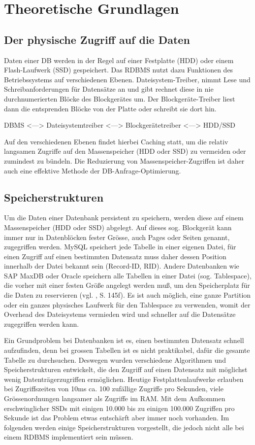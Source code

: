 \section{Theoretische Grundlagen}
\subsection{Der physische Zugriff auf die Daten}
Daten einer DB werden in der Regel auf einer Festplatte (HDD) oder einem Flash-Laufwerk (SSD) gespeichert.
Das RDBMS nutzt dazu Funktionen des Betriebssystems auf verschiedenen Ebenen.
Dateisystem-Treiber, nimmt Lese und Schreibanforderungen für Datensätze an und gibt rechnet diese in nie durchnumerierten Blöcke des Blockgerätes um. Der Blockgeräte-Treiber liest dann die entsprenden Blöcke von der Platte oder schreibt sie dort hin.

DBMS <---> Dateisystemtreiber <---> Blockgerätetreiber <---> HDD/SSD 

Auf den verschiedenen Ebenen findet hierbei Caching statt, um die relativ langsamen Zugriffe auf den Massenspeicher (HDD oder SSD) zu vermeiden oder zumindest zu bündeln. Die Reduzierung von Massenspeicher-Zugriffen ist  daher auch eine effektive Methode der DB-Anfrage-Optimierung.

\subsection{Speicherstrukturen}
Um die Daten einer Datenbank persistent zu speichern, werden diese auf einem Massenspeicher (HDD oder SSD)  abgelegt. Auf dieses sog. Blockgerät kann immer nur in Datenblöcken fester Grösse, auch Pages oder Seiten genannt, zugegriffen werden. MySQL speichert jede Tabelle in einer eigenen Datei, für einen Zugriff auf einen bestimmten Datensatz muss daher dessen Position innerhalb der Datei bekannt sein (Record-ID, RID). Andere Datenbanken wie SAP MaxDB oder Oracle speichern alle Tabellen in einer Datei (sog. Tablespace), die vorher mit einer festen Größe angelegt werden muß, um den Speicherplatz für die Daten zu reservieren (vgl. \cite{Sauer1998}, S. 145f). Es ist auch möglich, eine ganze Partition oder ein ganzes physisches Laufwerk für den Tablespace zu verwenden, womit der Overhead des Dateisystems vermieden wird und schneller auf die Datensätze zugegriffen werden kann.

Ein Grundproblem bei Datenbanken ist es, einen bestimmten Datensatz schnell aufzufinden, denn bei grossen Tabellen ist es nicht praktikabel, dafür die gesamte Tabelle zu durchsuchen. Deswegen wurden verschiedene Algorithmen und Speicherstrukturen entwickelt, die den Zugriff auf einen Datensatz mit möglichst wenig Datenträgerzugriffen ermöglichen. Heutige Festplattenlaufwerke erlauben bei Zugriffszeiten von 10ms ca. 100 zufällige Zugriffe pro Sekunden, viele Grössenordnungen langsamer als Zugriffe im RAM. Mit dem Aufkommen erschwinglicher SSDs mit einigen 10.000 bis zu einigen 100.000 Zugriffen pro Sekunde ist das Problem etwas entschärft aber immer noch vorhanden. Im folgenden werden einige Speicherstrukturen vorgestellt, die jedoch nicht alle bei einem RDBMS implementiert sein müssen.
